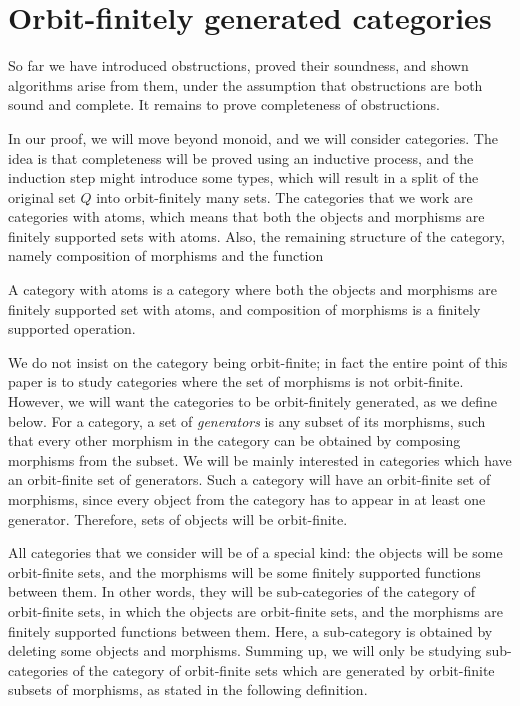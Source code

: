 
\section{Orbit-finitely generated categories}
\label{sec:orbit-finitely-generated-categories}

So far we have introduced obstructions, proved their soundness, and shown algorithms arise from them, under the assumption that obstructions are both sound and complete. It remains to prove completeness of obstructions. 


In our proof, we will move beyond monoid, and we will consider categories. The idea is that completeness will be proved using an inductive process, and the induction step might introduce some types, which will result in a split of the original set $Q$ into orbit-finitely many sets. The categories that we work are categories with atoms, which means that both the objects and morphisms are finitely supported sets with atoms. Also, the remaining structure of the category, namely composition of morphisms and the function 

\begin{definition}
    A category with atoms is a category where both the objects and morphisms are  finitely supported set with atoms, and  composition of morphisms is a finitely supported operation.
\end{definition}

We do not insist on the category being orbit-finite; in fact the entire point of this paper is to study categories where the set of morphisms is not orbit-finite. However, we will want the categories to be orbit-finitely generated, as we define below. For a category, a set of \emph{generators} is any subset of its morphisms, such that every other morphism in the category can be obtained by composing morphisms from the subset.  We will be mainly interested in categories which have an orbit-finite set of generators. Such  a category  will have an orbit-finite set of morphisms, since every object from the category has to appear in at least one generator. Therefore, sets of objects will be orbit-finite.  

All categories that we consider will be of a special kind: the objects will be some orbit-finite sets, and the morphisms will be some finitely supported functions between them. In other words, they will  be sub-categories of the category of orbit-finite sets, in which the objects are orbit-finite sets, and the morphisms are finitely supported functions between them. Here, a sub-category is obtained by deleting some objects and morphisms. Summing up, we will only be studying sub-categories of the category of orbit-finite sets which are generated by orbit-finite subsets of morphisms, as stated in the following definition.  
\newcommand{\generate}[1]{\tuple{#1}}



